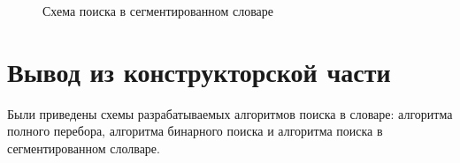 \begin{figure}[h!]
	
	
	\caption{Схема поиска в сегментированном словаре}
	
	\label{fig:segment_search}
	
\end{figure}


\clearpage
\section{Вывод из конструкторской части}

Были приведены схемы разрабатываемых алгоритмов поиска в словаре: алгоритма полного перебора, алгоритма бинарного поиска и алгоритма поиска в сегментированном слолваре. 


